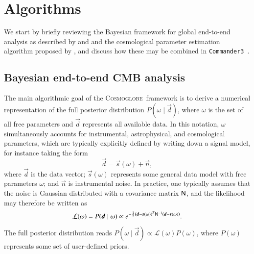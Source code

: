 \documentclass[twocolumn]{../common/aa}
\def\commanderthree{\texttt{Commander3}}
\renewcommand{\d}[0]{\vec{d}}
\newcommand{\n}[0]{\vec{n}}
\newcommand{\s}[0]{\vec{s}}
\newcommand{\N}[0]{\tens{N}}
\newcommand{\cosmoglobe}{\textsc{Cosmoglobe}}
\begin{document}
\section{Algorithms}
\label{sec:methods}

We start by briefly reviewing the Bayesian framework for global end-to-end analysis as described by \citet{bp01} and \citet{watts2023_dr1} and the cosmological parameter estimation algorithm proposed by \citet{racine:2016}, and discuss how these may be combined in \commanderthree\ \citep{bp03}.

\subsection{Bayesian end-to-end CMB analysis}

The main algorithmic goal of the \cosmoglobe\ framework is to derive a numerical representation of the full posterior distribution $P(\omega\mid\d)$, where $\omega$ is the set of all free parameters and $\d$ represents all available data. In this notation, $\omega$ simultaneously accounts for instrumental, astrophysical, and cosmological parameters, which are typically explicitly defined by writing down a signal model, for instance taking the form
\begin{equation}
    \label{eq:data_model}
    \d = \s(\omega) + \n,
\end{equation}
where $\d$ is the data vector; $\s(\omega)$ represents some general data model with free parameters $\omega$; and $\n$ is instrumental noise. In practice, one typically assumes that the noise is Gaussian distributed with a covariance matrix $\N$, and the likelihood may therefore be written as
\begin{equation}
  \mathcal{L}(\omega) = P(\d\mid\omega) \propto e^{-\frac{1}{2}\left(\d-\s(\omega)\right)^T\N^{-1}\left(\d-\s(\omega)\right)}.
\end{equation}
The full posterior distribution reads $P(\omega\mid\d) \propto \mathcal{L}(\omega)P(\omega)$, where $P(\omega)$ represents some set of user-defined priors.
\end{document}
